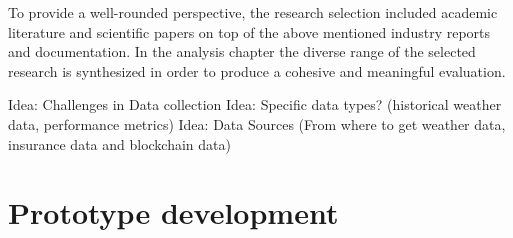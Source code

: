 To provide a well-rounded perspective, the research selection included academic literature and scientific papers on top of the above mentioned industry reports and documentation. In the analysis chapter the diverse range of the selected research is synthesized in order to produce a cohesive and meaningful evaluation.

Idea: Challenges in Data collection
Idea: Specific data types? (historical weather data, performance metrics)
Idea: Data Sources (From where to get weather data, insurance data and blockchain data)

\section{Prototype development}\label{section:prototype_development}